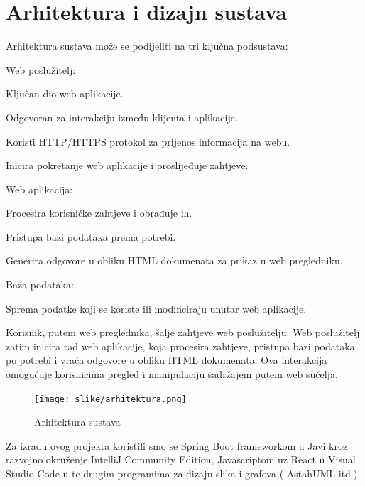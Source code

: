 \chapter{Arhitektura i dizajn sustava}

Arhitektura sustava može se podijeliti na tri ključna podsustava:

\begin{packed_enum}
	\item Web poslužitelj:
	\begin{packed_enum}
		\item Ključan dio web aplikacije.
		\item Odgovoran za interakciju između klijenta i aplikacije.
		\item Koristi HTTP/HTTPS protokol za prijenos informacija na webu.
		\item Inicira pokretanje web aplikacije i proslijeđuje zahtjeve.
	\end{packed_enum}
	\item Web aplikacija:
	\begin{packed_enum}
		\item Procesira korisničke zahtjeve i obrađuje ih.
		\item Pristupa bazi podataka prema potrebi.
		\item Generira odgovore u obliku HTML dokumenata za prikaz u web pregledniku.
	\end{packed_enum}			
	\item Baza podataka:	
	\begin{packed_enum}
		\item Sprema podatke koji se koriste ili modificiraju unutar web aplikacije.
	\end{packed_enum}
\end{packed_enum}

Korisnik, putem web preglednika, šalje zahtjeve web poslužitelju. 
Web poslužitelj zatim inicira rad web aplikacije, koja procesira zahtjeve, pristupa bazi podataka po potrebi i vraća odgovore u obliku HTML dokumenata. 
Ova interakcija omogućuje korisnicima pregled i manipulaciju sadržajem putem web sučelja.

\begin{figure}[H]
	\texttt{[image: slike/arhitektura.png]}
	\centering
	\caption{Arhitektura sustava}
	\label{fig:arhitektura}
\end{figure}

Za izradu ovog projekta koristili smo se Spring Boot frameworkom u Javi kroz
razvojno okruženje IntelliJ Community Edition, Javascriptom uz React u Visual
Studio Code-u te drugim programima za dizajn slika i grafova ( AstahUML itd.).


